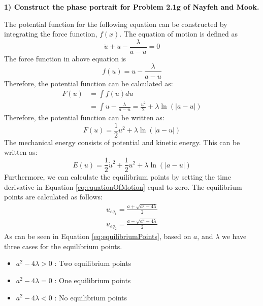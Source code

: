 \documentclass[14pt, a4paper]{extreport}
\begin{document}
\begin{flushleft}
{\large\textbf{1) Construct the phase portrait for Problem 2.1g of Nayfeh and Mook.}}
\end{flushleft}

The potential function for the following equation can be constructed by integrating the force function, $f(x)$. The equation of motion is defined as
%
\begin{equation}\label{eq:equationOfMotion}
	\ddot{u} + u - \frac{\lambda}{a - u} = 0
\end{equation}
%
The force function in above equation is
%
\begin{equation}
	f(u) = u - \frac{\lambda}{a - u}
\end{equation}
%
Therefore, the potential function can be calculated as:
%
\begin{subequations}
\begin{align*}
	F(u) &= \int f(u) du \\
		&= \int u - \frac{\lambda}{a - u} = \frac{u^2}{2} + \lambda \ln \left( |a - u| \right)
\end{align*}
\end{subequations}
%
Therefore, the potential function can be written as:
%
\begin{equation}
	F(u) = \frac{1}{2}u^2 + \lambda \ln \left( |a - u| \right)
\end{equation}
%
The mechanical energy consists of potential and kinetic energy. This can be written as:
%
\begin{equation}\label{eq:mechanicalEnergy}
	E(u) = \frac{1}{2} \dot{u}^2 + \frac{1}{2}u^2 + \lambda \ln \left( |a - u| \right)
\end{equation}
%
Furthermore, we can calculate the equilibrium points by setting the time derivative in Equation \eqref{eq:equationOfMotion} equal to zero. The equilibrium points are calculated as follows:
%
\begin{subequations}\label{eq:equilibriumPoints}
\begin{align}
	u_{eq_1} = \frac{a + \sqrt{a^2 - 4\lambda}}{2} \\
	u_{eq_2} = \frac{a - \sqrt{a^2 - 4\lambda}}{2}
\end{align}
\end{subequations}
%
As can be seen in Equation \eqref{eq:equilibriumPoints}, based on $a$, and $\lambda$ we have three cases for the equilibrium points.
%
\begin{itemize}
	\item $a^2 - 4\lambda > 0$ : Two equilibrium points
	\item $a^2 - 4\lambda = 0$ : One equilibrium points
	\item $a^2 - 4\lambda < 0$ : No equilibrium points
\end{itemize}
\end{document}
